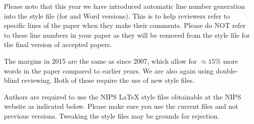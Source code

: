\documentclass{article} %
\begin{document}
Please note that this year we have introduced automatic line number generation
into the style file (for \LaTeXe and Word versions). This is to help reviewers
refer to specific lines of the paper when they make their comments. Please do
NOT refer to these line numbers in your paper as they will be removed from the
style file for the final version of accepted papers.

The margins in 2015 are the same as since 2007, which allow for $\approx 15\%$
more words in the paper compared to earlier years. We are also again using 
double-blind reviewing. Both of these require the use of new style files.

Authors are required to use the NIPS \LaTeX{} style files obtainable at the
NIPS website as indicated below. Please make sure you use the current files and
not previous versions. Tweaking the style files may be grounds for rejection.






\end{document}
